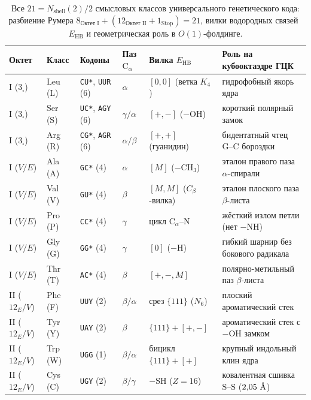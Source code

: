 \begin{table}[htbp]
\centering
\caption{Все $21 = N_{\mathrm{shell}}(2)/2$ смысловых классов универсального генетического кода: разбиение Румера $8_{\text{Октет I}} + (12_{\text{Октет II}} + 1_{\text{Stop}}) = 21$, вилки водородных связей~$E_{\mathrm{HB}}$ и геометрическая роль в $O(1)$-фолдинге.}
\label{tab:bio-21-amino-acids}
\footnotesize
\setlength{\tabcolsep}{3.5pt}
\begin{tabular}{@{}llllll@{}}
\toprule
Октет & Класс & Кодоны & Паз $\text{C}_\alpha$ & Вилка $E_{\mathrm{HB}}$ & Роль на кубооктаэдре ГЦК \\
\midrule
I ($3_\square$) & Leu (L) & \texttt{CU*}, \texttt{UUR} (6) & $\alpha$ & $[0,0]$ (ветка $K_4$) & гидрофобный якорь ядра \\
I ($3_\square$) & Ser (S) & \texttt{UC*}, \texttt{AGY} (6) & $\gamma/\alpha$ & $[+,-]$ ($-\text{OH}$) & короткий полярный замок \\
I ($3_\square$) & Arg (R) & \texttt{CG*}, \texttt{AGR} (6) & $\alpha/\beta$ & $[+,+]$ (гуанидин) & бидентатный чтец $\text{G--C}$ бороздки \\
\midrule
I ($V/E$) & Ala (A) & \texttt{GC*} (4) & $\alpha$ & $[M]$ ($-\text{CH}_3$) & эталон правого паза $\alpha$-спирали \\
I ($V/E$) & Val (V) & \texttt{GU*} (4) & $\beta$ & $[M,M]$ ($C_\beta$-вилка) & эталон плоского паза $\beta$-листа \\
I ($V/E$) & Pro (P) & \texttt{CC*} (4) & $\gamma$ & цикл $\text{C}_\alpha\text{--N}$ & жёсткий излом петли (нет $-\text{NH}$) \\
I ($V/E$) & Gly (G) & \texttt{GG*} (4) & $\gamma$ & $[0]$ ($-\text{H}$) & гибкий шарнир без бокового радикала \\
I ($V/E$) & Thr (T) & \texttt{AC*} (4) & $\beta$ & $[+,-,M]$ & полярно-метильный паз $\beta$-листа \\
\midrule
II ($12_E/V$) & Phe (F) & \texttt{UUY} (2) & $\beta/\alpha$ & срез $\{111\}$ ($N_6$) & плоский ароматический стек \\
II ($12_E/V$) & Tyr (Y) & \texttt{UAY} (2) & $\beta$ & $\{111\} + [+,-]$ & ароматический стек с $-\text{OH}$ замком \\
II ($12_E/V$) & Trp (W) & \texttt{UGG} (1) & $\beta/\alpha$ & бицикл $\{111\} + [+]$ & крупный индольный клин ядра \\
II ($12_E/V$) & Cys (C) & \texttt{UGY} (2) & $\beta/\gamma$ & $-\text{SH}$ ($Z=16$) & ковалентная сшивка $\text{S--S}$ ($2{,}05\ \text{\normalfont\AA}$) \\

\end{tabular}
\end{table}

